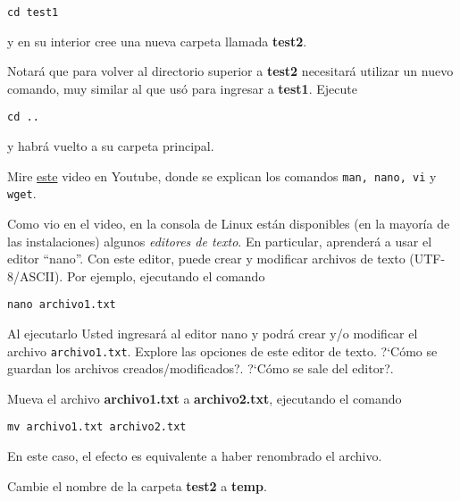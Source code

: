 \documentclass[11pt]{exam}
\begin{document}
\begin{questions}
\begin{parts}
\begin{verbatim}
cd test1
\end{verbatim}

y en su interior cree una nueva carpeta llamada \textbf{test2}.

\item Notará que para volver al directorio superior a \textbf{test2} necesitará utilizar un nuevo comando, muy similar al que usó para ingresar a \textbf{test1}. Ejecute

\begin{verbatim}
cd ..
\end{verbatim}

y habrá vuelto a su carpeta principal.

\item Mire \href{https://www.youtube.com/watch?v=4Cz8E71PYd4}{este} video en Youtube, donde se explican los comandos \texttt{man, nano, vi} y \texttt{wget}.

\item Como vio en el video, en la consola de Linux están disponibles (en la mayoría de las instalaciones) algunos \textit{editores de texto}. En particular, aprenderá a usar el editor ``nano''. Con este editor, puede crear y modificar archivos de texto (UTF-8/ASCII). Por ejemplo, ejecutando el comando 

\begin{verbatim}
nano archivo1.txt
\end{verbatim}

Al ejecutarlo Usted ingresará al editor nano y podrá crear y/o modificar el archivo \texttt{archivo1.txt}.
 Explore las opciones de este editor de texto. ?`Cómo se guardan los archivos creados/modi\-fi\-ca\-dos?. ?`Cómo se sale del editor?.

\item Mueva el archivo \textbf{archivo1.txt} a \textbf{archivo2.txt}, ejecutando el comando

\begin{verbatim}
mv archivo1.txt archivo2.txt
\end{verbatim}

En este caso, el efecto es equivalente a haber renombrado el archivo.

\item Cambie el nombre de la carpeta \textbf{test2} a \textbf{temp}.

\end{parts}


\end{questions}
\end{document}
